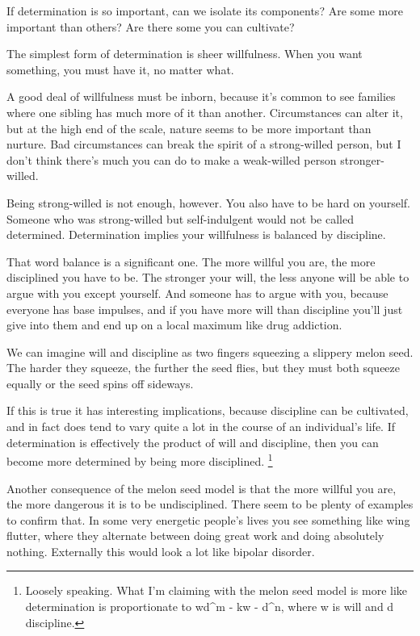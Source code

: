 If determination is so important, can we isolate its components? Are
some more important than others? Are there some you can cultivate?

The simplest form of determination is sheer willfulness. When you want
something, you must have it, no matter what.

A good deal of willfulness must be inborn, because it's common to see
families where one sibling has much more of it than another.
Circumstances can alter it, but at the high end of the scale, nature
seems to be more important than nurture. Bad circumstances can break the
spirit of a strong-willed person, but I don't think there's much you can
do to make a weak-willed person stronger-willed.

Being strong-willed is not enough, however. You also have to be hard on
yourself. Someone who was strong-willed but self-indulgent would not be
called determined. Determination implies your willfulness is balanced by
discipline.

That word balance is a significant one. The more willful you are, the
more disciplined you have to be. The stronger your will, the less anyone
will be able to argue with you except yourself. And someone has to argue
with you, because everyone has base impulses, and if you have more will
than discipline you'll just give into them and end up on a local maximum
like drug addiction.

We can imagine will and discipline as two fingers squeezing a slippery
melon seed. The harder they squeeze, the further the seed flies, but
they must both squeeze equally or the seed spins off sideways.

If this is true it has interesting implications, because discipline can
be cultivated, and in fact does tend to vary quite a lot in the course
of an individual's life. If determination is effectively the product of
will and discipline, then you can become more determined by being more
disciplined. \footnote{Loosely speaking. What I'm claiming with the melon seed model is
more like determination is proportionate to wd\^{}m - k\textbar w -
d\textbar\^{}n, where w is will and d discipline.}

Another consequence of the melon seed model is that the more willful you
are, the more dangerous it is to be undisciplined. There seem to be
plenty of examples to confirm that. In some very energetic people's
lives you see something like wing flutter, where they alternate between
doing great work and doing absolutely nothing. Externally this would
look a lot like bipolar disorder.

